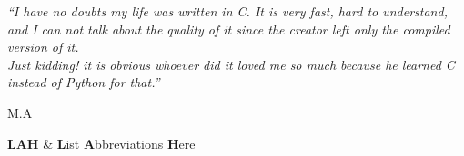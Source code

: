 \documentclass[a4paper, 11pt, oneside]{Thesis}
\begin{document}
\pagestyle{empty}  %

\null\vfill
\textit{``I have no doubts my life was written in C. It is very fast, hard to understand, and I can not talk about the quality of it since the creator left only the compiled version of it. \\
Just kidding! it is obvious whoever did it loved me so much because he learned C instead of Python for that.''}

\begin{flushright}
M.A
\end{flushright}

\vfill\vfill\vfill\vfill\vfill\vfill\null
\clearpage  %


\clearpage  %


\pagestyle{fancy}  %


\tableofcontents  %

\listoffigures  %

\listoftables  %

\clearpage  %
{
\textbf{LAH} & \textbf{L}ist \textbf{A}bbreviations \textbf{H}ere \\

}
\end{document}

